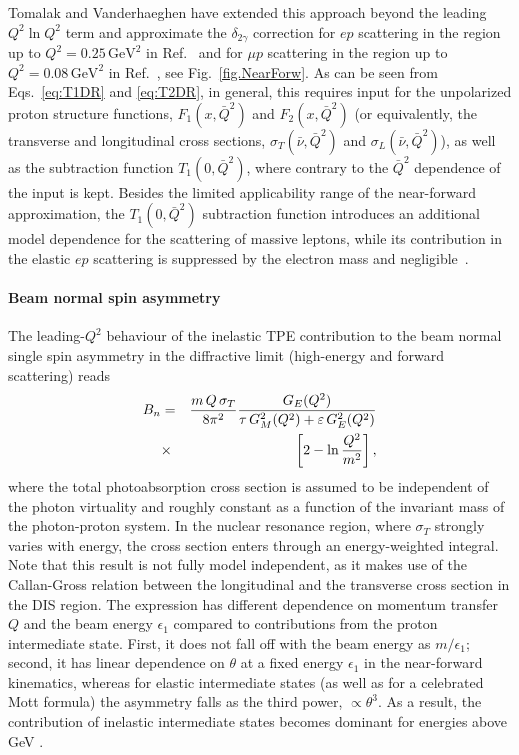 Tomalak and Vanderhaeghen have extended this approach beyond the leading $Q^2 \ln Q^2$ term and approximate the $\delta_{2\gamma}$ correction for $ep$ scattering in the region up to $Q^2=0.25\,\text{GeV}^2$ in Ref.~\cite{Tomalak:2015aoa} and for 
$\mu p$ scattering in the region up to $Q^2=0.08\,\text{GeV}^2$ in Ref.~\cite{Tomalak:2015hva}, see Fig.~\ref{fig.NearForw}. As can be seen from Eqs.~\ref{eq:T1DR} and \ref{eq:T2DR}, in general, this requires input for the unpolarized proton structure functions, $F_1(x,\bar Q^2)$ and $F_2(x,\bar Q^2)$ (or equivalently, the transverse and longitudinal cross sections, $\sigma_T(\bar \nu,\bar Q^2)$ and $\sigma_L(\bar \nu,\bar Q^2)$), as well as the subtraction function $T_1(0,\bar Q^2)$, where contrary to  the $\bar Q^2$ dependence of the input is kept. Besides the limited applicability range of the near-forward approximation, the $T_1(0,\bar Q^2)$ subtraction function introduces an additional model dependence for the scattering of massive leptons, while its contribution in the elastic $ep$ scattering is suppressed by the electron mass and negligible~\cite{Tomalak:2015aoa}.


\paragraph{Beam normal spin asymmetry}

The leading-$Q^2$ behaviour of the inelastic TPE contribution to the beam normal single spin asymmetry in the diffractive limit (high-energy and forward scattering) reads  \cite{Afanasev:2004pu,Gorchtein:2005za} 
\begin{eqnarray}
\eqlab{BnlowQ}
B_n&=&\frac{m \,Q \,\sigma_T}{8\pi^2}\frac{G_E(Q^2)}{\tau \,G_M^2(Q^2)+\varepsilon \,G_E^2(Q^2)}\nn \\
&\times&\left[2-\ln \frac{Q^2}{m^2}\right],
\end{eqnarray}
where the total photoabsorption cross section is assumed to be independent of the photon virtuality and roughly constant as a function of the invariant mass of the photon-proton system. In the nuclear resonance region, where $\sigma_T$ strongly varies with energy, the cross section enters through an energy-weighted integral. Note that this result is not fully model independent, as it makes use of the Callan-Gross relation \cite{Callan:1969uq} between the longitudinal and the transverse cross section in the DIS region.
The expression  has different dependence on momentum transfer $Q$ and the beam energy $\epsilon_1$ compared to contributions from the proton intermediate state. First, it does not fall off with the beam energy as $m/\epsilon_1$; second, it has linear dependence on $\theta$ at a fixed energy $\epsilon_1$ in the near-forward kinematics, whereas for elastic intermediate states (as well as for a celebrated Mott formula) the asymmetry falls as the third power, $\propto\theta^3$. As a result, the contribution of inelastic intermediate states becomes dominant for energies above GeV \cite{pasquini2004resonance, Afanasev:2004pu, Gorchtein:2005za}.

